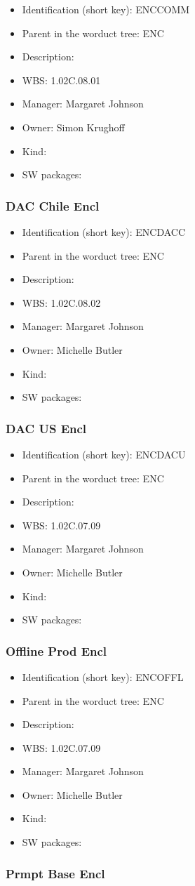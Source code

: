 \begin{itemize}\item Identification (short key): ENCCOMM
\item Parent in the worduct tree: ENC
\item Description: 
\item WBS: 1.02C.08.01
\item Manager: Margaret Johnson
\item Owner: Simon Krughoff
\item Kind:
\item SW packages: 
\end{itemize}\subsubsection{DAC Chile Encl}
\begin{itemize}\item Identification (short key): ENCDACC
\item Parent in the worduct tree: ENC
\item Description: 
\item WBS: 1.02C.08.02
\item Manager: Margaret Johnson
\item Owner: Michelle Butler
\item Kind:
\item SW packages: 
\end{itemize}\subsubsection{DAC US Encl}
\begin{itemize}\item Identification (short key): ENCDACU
\item Parent in the worduct tree: ENC
\item Description: 
\item WBS: 1.02C.07.09
\item Manager: Margaret Johnson
\item Owner: Michelle Butler
\item Kind:
\item SW packages: 
\end{itemize}\subsubsection{Offline Prod Encl}
\begin{itemize}\item Identification (short key): ENCOFFL
\item Parent in the worduct tree: ENC
\item Description: 
\item WBS: 1.02C.07.09
\item Manager: Margaret Johnson
\item Owner: Michelle Butler
\item Kind:
\item SW packages: 
\end{itemize}\subsubsection{Prmpt Base Encl}
